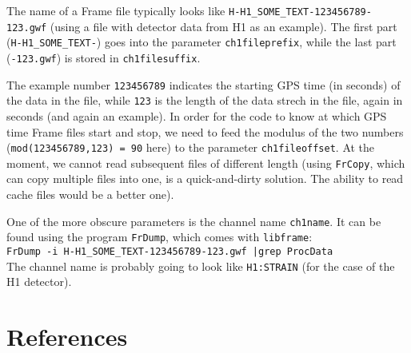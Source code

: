 The name of a Frame file typically looks like \texttt{H-H1\_SOME\_TEXT-123456789-123.gwf}
(using a file with detector data from H1 as an example).  The first part (\texttt{H-H1\_SOME\_TEXT-})
goes into the parameter \texttt{ch1fileprefix}, while the last part (\texttt{-123.gwf}) 
is stored in \texttt{ch1filesuffix}.

The example number \texttt{123456789} indicates the starting GPS time (in seconds) of the 
data in the file, while \texttt{123} is the length of the data strech in the file, again 
in seconds (and again an example). In order for the code to know at which GPS time Frame
files start and stop, we need to feed the modulus of the two numbers (\texttt{mod(123456789,123) = 90}
here) to the parameter \texttt{ch1fileoffset}.  At the moment, we cannot read subsequent files
of different length (using \texttt{FrCopy}, which can copy multiple files into one, is a 
quick-and-dirty solution. The ability to read cache files would be a better one).

One of the more obscure parameters is the channel name \texttt{ch1name}.  It can be found 
using the program \texttt{FrDump}, which comes with \texttt{libframe}: \\
\texttt{FrDump -i H-H1\_SOME\_TEXT-123456789-123.gwf |grep ProcData}\\
The channel name is probably going to look like \texttt{H1:STRAIN} (for the case of
the H1 detector).



\pagebreak
\section*{References}








